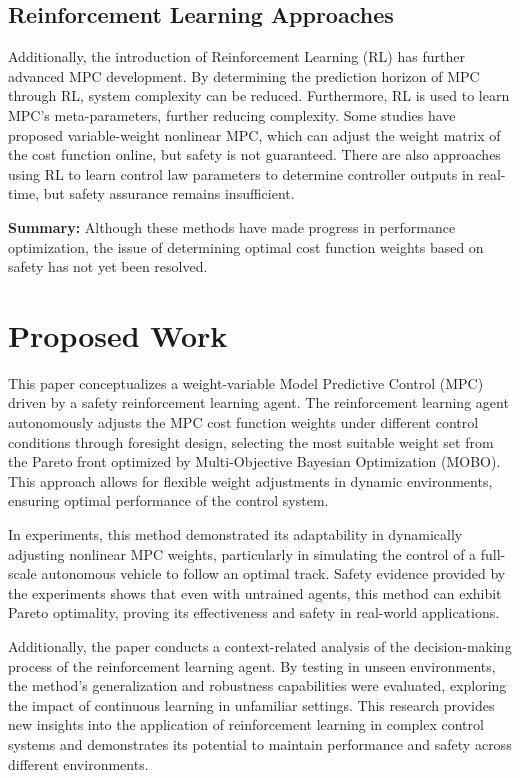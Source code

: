 \subsection{Reinforcement Learning Approaches}
Additionally, the introduction of Reinforcement Learning (RL) has further advanced MPC development. By determining the prediction horizon of MPC through RL, system complexity can be reduced. Furthermore, RL is used to learn MPC's meta-parameters, further reducing complexity. Some studies have proposed variable-weight nonlinear MPC, which can adjust the weight matrix of the cost function online, but safety is not guaranteed. There are also approaches using RL to learn control law parameters to determine controller outputs in real-time, but safety assurance remains insufficient.

\textbf{Summary:} Although these methods have made progress in performance optimization, the issue of determining optimal cost function weights based on safety has not yet been resolved.

\section{Proposed Work}
This paper conceptualizes a weight-variable Model Predictive Control (MPC) driven by a safety reinforcement learning agent. The reinforcement learning agent autonomously adjusts the MPC cost function weights under different control conditions through foresight design, selecting the most suitable weight set from the Pareto front optimized by Multi-Objective Bayesian Optimization (MOBO). This approach allows for flexible weight adjustments in dynamic environments, ensuring optimal performance of the control system.

In experiments, this method demonstrated its adaptability in dynamically adjusting nonlinear MPC weights, particularly in simulating the control of a full-scale autonomous vehicle to follow an optimal track. Safety evidence provided by the experiments shows that even with untrained agents, this method can exhibit Pareto optimality, proving its effectiveness and safety in real-world applications.

Additionally, the paper conducts a context-related analysis of the decision-making process of the reinforcement learning agent. By testing in unseen environments, the method's generalization and robustness capabilities were evaluated, exploring the impact of continuous learning in unfamiliar settings. This research provides new insights into the application of reinforcement learning in complex control systems and demonstrates its potential to maintain performance and safety across different environments.
    
